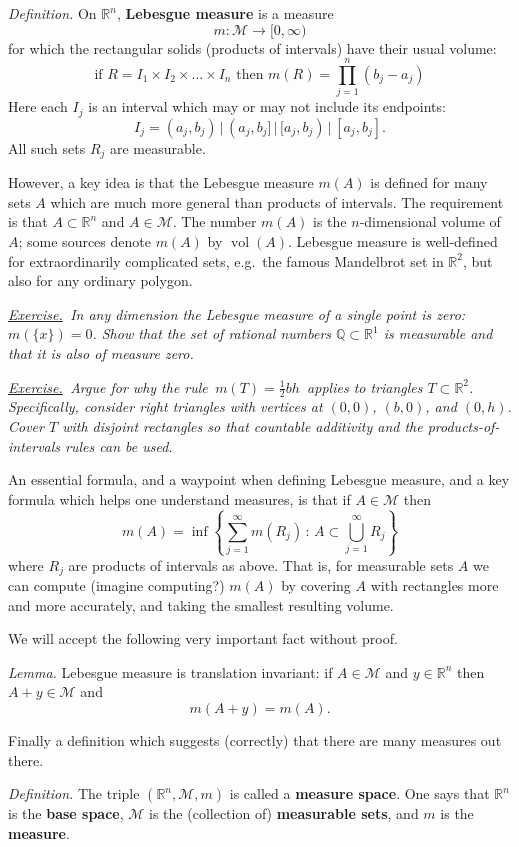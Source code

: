 \documentclass[12pt]{article}
\newcommand{\cM}{\mathcal{M}}
\newcommand{\QQ}{\mathbb{Q}}
\newcommand{\RR}{\mathbb{R}}
\newcommand{\defin}{\emph{Definition.}\,\,}
\newcommand{\lem}{\emph{Lemma.}\,\,}
\newcommand{\exer}[2]{\emph{\underline{Exercise.}\, #2} \vspace*{#1mm}}
\begin{document}
\defin On $\RR^n$, \textbf{Lebesgue measure} is a measure
	$$m : \cM \to [0,\infty)$$
for which the rectangular solids (products of intervals) have their usual volume:
	$$\text{if } R = I_1\times I_2 \times \dots \times I_n \text{ then } m(R) = \prod_{j=1}^n (b_j - a_j)$$
Here each $I_j$ is an interval which may or may not include its endpoints:
	$$I_j = (a_j,b_j) \,\Big|\, (a_j,b_j] \,\Big|\, [a_j,b_j) \,\Big|\, [a_j,b_j].$$
All such sets $R_j$ are measurable.

However, a key idea is that the Lebesgue measure $m(A)$ is defined for many sets $A$ which are much more general than products of intervals.  The requirement is that $A\subset \RR^n$ and $A\in \cM$.  The number $m(A)$ is the $n$-dimensional volume of $A$; some sources denote $m(A)$ by $\operatorname{vol}(A)$.  Lebesgue measure is well-defined for extraordinarily complicated sets, e.g.~the famous Mandelbrot set in $\RR^2$, but also for any ordinary polygon.

\exer{40}{In any dimension the Lebesgue measure of a single point is zero: $m(\{x\})=0$.  Show that the set of rational numbers $\QQ \subset \RR^1$ is measurable and that it is also of measure zero.}

\exer{60}{Argue for why the rule \,$m(T)=\frac{1}{2} b h$\, applies to triangles $T\subset \RR^2$.  Specifically, consider right triangles with vertices at $(0,0)$, $(b,0)$, and $(0,h)$.  Cover $T$ with disjoint rectangles so that countable additivity and the products-of-intervals rules can be used.}

\clearpage\newpage
An essential formula, and a waypoint when defining Lebesgue measure, and a key formula which helps one understand measures, is that if $A\in\cM$ then
	$$m(A) = \inf \left\{\sum_{j=1}^\infty m(R_j) \,:\, A \subset \bigcup_{j=1}^\infty R_j\right\}$$
where $R_j$ are products of intervals as above.  That is, for measurable sets $A$ we can compute (imagine computing?) $m(A)$ by covering $A$ with rectangles more and more accurately, and taking the smallest resulting volume.

We will accept the following very important fact without proof.

\lem Lebesgue measure is translation invariant: if $A\in \cM$ and $y\in\RR^n$ then $A+y\in\cM$ and
	$$m(A+y) = m(A).$$

Finally a definition which suggests (correctly) that there are many measures out there.

\defin  The triple $(\RR^n,\cM,m)$ is called a \textbf{measure space}.  One says that $\RR^n$ is the \textbf{base space}, $\cM$ is the (collection of) \textbf{measurable sets}, and $m$ is the \textbf{measure}.
\end{document}
